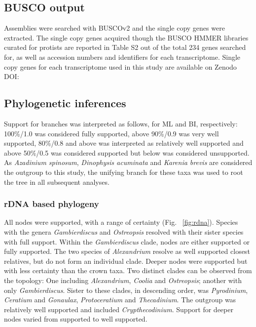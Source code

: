 \documentclass[12pt]{article}
\begin{document}
\subsection*{BUSCO output}
Assemblies were searched with BUSCOv2 and the single copy genes were extracted. 
The single copy genes acquired though the BUSCO HMMER libraries curated for protists are reported in Table S2 out of the total 234 genes searched for, as well as accession numbers and identifiers for each transcriptome. 
Single copy genes for each transcriptome used in this study are available on Zenodo DOI:

\subsection*{Phylogenetic inferences}
Support for branches was interpreted as follows, for ML and BI, respectively: 100\%/1.0 was considered fully supported, above 90\%/0.9 was very well supported, 80\%/0.8 and above was interpreted as relatively well supported and above 50\%/0.5 was considered supported but below was considered unsupported.
As \emph{Azadinium spinosum}, \emph{Dinophysis acuminata} and \emph{Karenia brevis} are considered the outgroup to this study, the unifying branch for these taxa was used to root the tree in all subsequent analyses.
\subsubsection*{rDNA based phylogeny}
\FloatBarrier 
All nodes were supported, with a range of certainty (Fig. ~\ref{fig:rdna}).
Species with the genera \emph{Gambierdiscus} and \emph{Ostreopsis} resolved with their sister species with full support. 
Within the \emph{Gambierdiscus} clade, nodes are either supported or fully supported. 
The two species of \emph{Alexandrium} resolve as well supported closest relatives, but do not form an individual clade. 
Deeper nodes were supported but with less certainty than the crown taxa. 
Two distinct clades can be observed from the topology: One including \emph{Alexandrium}, \emph{Coolia} and \emph{Ostreopsis}; another with only \emph{Gambierdiscus}. 
Sister to these clades, in descending order, was \emph{Pyrodinium}, \emph{Ceratium} and \emph{Gonaulax}, \emph{Protoceratium} and \emph{Thecadinium}. 
The outgroup was relatively well supported and included \emph{Crypthecodinium}. 
Support for deeper nodes varied from supported to well supported.
\end{document}
